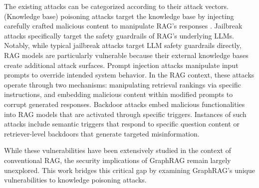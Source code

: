 The existing attacks can be categorized according to their attack vectors.  (Knowledge base) poisoning attacks target the knowledge base by injecting carefully crafted malicious content to manipulate RAG's responses .  Jailbreak attacks specifically target the safety guardrails of RAG's underlying LLMs. Notably, while typical jailbreak attacks target LLM safety guardrails directly, RAG models are particularly vulnerable because their external knowledge bases create additional attack surfaces.  Prompt injection attacks manipulate input prompts to override intended system behavior. In the RAG context, these attacks operate through two mechanisms: manipulating retrieval rankings via specific instructions, and embedding malicious content within modified prompts to corrupt generated responses.  Backdoor attacks embed malicious functionalities into RAG models that are activated through specific triggers. Instances of such attacks include semantic triggers that respond to specific question content or retriever-level backdoors that generate targeted misinformation.


While these vulnerabilities have been extensively studied in the context of conventional RAG, the security implications of GraphRAG remain largely unexplored. This work bridges this critical gap by examining GraphRAG's unique vulnerabilities to knowledge poisoning attacks.

